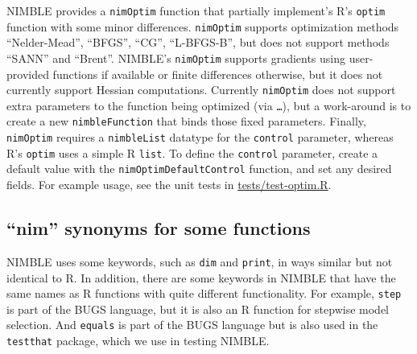 \documentclass[12pt,oneside]{book}\usepackage[]{graphicx}\usepackage[]{color}
\def\cd#1{\texttt{#1}}
\begin{document}
NIMBLE provides a \cd{nimOptim} function that partially implement's R's
\cd{optim} function with some minor differences.  \cd{nimOptim} supports
optimization methods ``Nelder-Mead'', ``BFGS'', ``CG'', ``L-BFGS-B'', but does
not support methods ``SANN'' and ``Brent''. NIMBLE's \cd{nimOptim} supports
gradients using user-provided functions if available or finite differences
otherwise, but it does not currently support Hessian computations. Currently
\cd{nimOptim} does not support extra parameters to the function being optimized
(via \cd{\dots}), but a work-around is to create a new \cd{nimbleFunction} that
binds those fixed parameters. Finally, \cd{nimOptim} requires a \cd{nimbleList}
datatype for the \cd{control} parameter, whereas R's \cd{optim} uses a simple R
\cd{list}. To define the \cd{control} parameter, create a default value with
the \cd{nimOptimDefaultControl} function, and set any desired fields. For
example usage, see the unit tests in
\href{https://github.com/nimble-dev/nimble/blob/master/packages/nimble/inst/tests/test-optim.R}{tests/test-optim.R}.

\subsection{``nim'' synonyms for some functions}
\label{sec:altern-keyw-some}

NIMBLE uses some keywords, such as \cd{dim} and \cd{print}, in ways
similar but not identical to R. In addition, there are some keywords
in NIMBLE that have the same names as R functions with quite different functionality.
For example, \cd{step} is part of the BUGS language, but it is also an
R function for stepwise model selection.  And \cd{equals} is part of
the BUGS language but is also used in the \cd{testthat} package, which
we use in testing NIMBLE.
\end{document}
